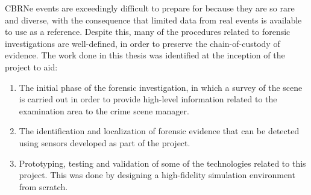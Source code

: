 CBRNe events are exceedingly difficult to prepare for because they are so rare and diverse, with the consequence that limited data from real events is available to use as a reference. Despite this, many of the procedures related to forensic investigations are well-defined, in order to preserve the chain-of-custody of evidence. The work done in this thesis was identified at the inception of the project to aid: 
\begin{enumerate}
    \item The initial phase of the forensic investigation, in which a survey of the scene is carried out in order to provide high-level information related to the examination area to the crime scene manager.
    \item The identification and localization of forensic evidence that can be detected using sensors developed as part of the project.
    \item Prototyping, testing and validation of some of the technologies related to this project. This was done by designing a high-fidelity simulation environment from scratch.
\end{enumerate}



